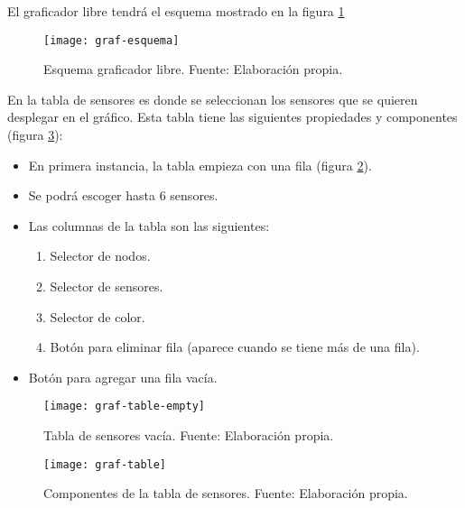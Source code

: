 El graficador libre tendrá el esquema mostrado en la figura \ref*{fig:graf-esquema}

\begin{figure}[H]
	\centering
	\texttt{[image: graf-esquema]}
	\caption{\label{fig:graf-esquema} Esquema graficador libre. Fuente: Elaboración propia.}
\end{figure}

En la tabla de sensores es donde se seleccionan los sensores que se quieren desplegar en el gráfico. Esta tabla tiene las siguientes propiedades y componentes (figura \ref{fig:graf-table}):
\begin{itemize}
    \item En primera instancia, la tabla empieza con una fila (figura \ref{fig:graf-table-empty}).
    \item Se podrá escoger hasta 6 sensores.
    \item Las columnas de la tabla son las siguientes:
          \begin{enumerate}
              \item Selector de nodos.
              \item Selector de sensores.
              \item Selector de color.
              \item Botón para eliminar fila (aparece cuando se tiene más de una fila).
          \end{enumerate}
    \item Botón para agregar una fila vacía.
\end{itemize}

\begin{figure}[H]
	\centering
	\texttt{[image: graf-table-empty]}
	\caption{\label{fig:graf-table-empty} Tabla de sensores vacía. Fuente: Elaboración propia.}
\end{figure}

\begin{figure}[H]
	\centering
	\texttt{[image: graf-table]}
	\caption{\label{fig:graf-table} Componentes de la tabla de sensores. Fuente: Elaboración propia.}
\end{figure}

